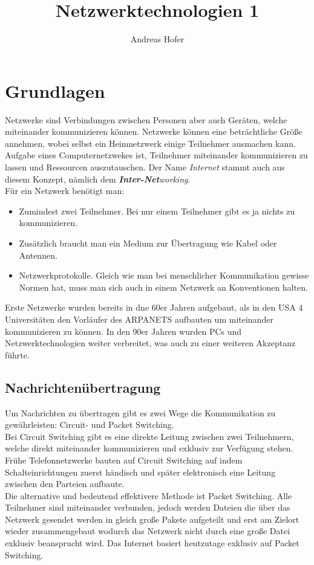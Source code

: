 \documentclass{article}
\title{\vspace{-1cm} Netzwerktechnologien 1}
\author{Andreas Hofer}
\begin{document}
	\maketitle
	\tableofcontents
	\section{Grundlagen}
	Netzwerke sind Verbindungen zwischen Personen aber auch Geräten, welche miteinander kommunizieren können. Netzwerke können eine beträchtliche Größe annehmen, wobei selbst ein Heimnetzwerk einige Teilnehmer ausmachen kann. Aufgabe eines Computernetzwekes ist, Teilnehmer miteinander kommunizieren zu lassen und Ressourcen auszutauschen. Der Name \textit{Internet} stammt auch aus diesem Konzept, nämlich dem \textit{\textbf{Inter-Net}working}. \\
	Für ein Netzwerk benötigt man:
	\begin{itemize}
	 	\item{Zumindest zwei Teilnehmer. Bei nur einem Teilnehmer gibt es ja nichts zu kommunizieren.}
	 	\item{Zusätzlich braucht man ein Medium zur Übertragung wie Kabel oder Antennen.}
	 	\item{Netzwerkprotokolle. Gleich wie man bei menschlicher Kommunikation gewisse Normen hat, muss man sich auch in einem Netzwerk an Konventionen halten.}
	 \end{itemize}
	 Erste Netzwerke wurden bereits in dne 60er Jahren aufgebaut, als in den USA 4 Universitäten den Vorläufer des ARPANETS aufbauten um miteinander kommunizieren zu können. In den 90er Jahren wurden PCs und Netzwerktechnologien weiter verbreitet, was auch zu einer weiteren Akzeptanz führte. \\
	 \subsection{Nachrichtenübertragung}
	 Um Nachrichten zu übertragen gibt es zwei Wege die Kommunikation zu gewährleisten: Circuit- und Packet Switching. \\
	 Bei Circuit Switching gibt es eine direkte Leitung zwischen zwei Teilnehmern, welche direkt miteinander kommunizieren und exklusiv zur Verfügung stehen. Frühe Telefonnetzwerke bauten auf Circuit Switching auf indem Schalteinrichtungen zuerst händisch und später elektronisch eine Leitung zwischen den Parteien aufbaute. \\
	 Die alternative und bedeutend effektivere Methode ist Packet Switching. Alle Teilnehmer sind miteinander verbunden, jedoch werden Dateien die über das Netzwerk gesendet werden in gleich große Pakete aufgeteilt und erst am Zielort wieder zusammengebaut wodurch das Netzwerk nicht durch eine große Datei exklusiv beansprucht wird. Das Internet basiert heutzutage exklusiv auf Packet Switching. \\
\end{document}
